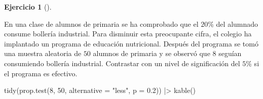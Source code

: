 \documentclass[
  a4paper,
]{scrreport}
\newenvironment{Shaded}{\begin{snugshade}}{\end{snugshade}}
\newcommand{\AttributeTok}[1]{\textcolor[rgb]{0.40,0.45,0.13}{#1}}
\newcommand{\DecValTok}[1]{\textcolor[rgb]{0.68,0.00,0.00}{#1}}
\newcommand{\FloatTok}[1]{\textcolor[rgb]{0.68,0.00,0.00}{#1}}
\newcommand{\FunctionTok}[1]{\textcolor[rgb]{0.28,0.35,0.67}{#1}}
\newcommand{\NormalTok}[1]{\textcolor[rgb]{0.00,0.23,0.31}{#1}}
\newcommand{\SpecialCharTok}[1]{\textcolor[rgb]{0.37,0.37,0.37}{#1}}
\newcommand{\StringTok}[1]{\textcolor[rgb]{0.13,0.47,0.30}{#1}}
\theoremstyle{definition}
\newtheorem{exercise}{Ejercicio}[chapter]
\theoremstyle{remark}
\begin{document}
\begin{exercise}[]\protect\hypertarget{exr-contraste-proporcion-bolleria-industrial}{}\label{exr-contraste-proporcion-bolleria-industrial}

En una clase de alumnos de primaria se ha comprobado que el \(20\)\% del
alumnado consume bollería industrial. Para disminuir esta preocupante
cifra, el colegio ha implantado un programa de educación nutricional.
Después del programa se tomó una muestra aleatoria de \(50\) alumnos de
primaria y se observó que 8 seguían consumiendo bollería industrial.
Contrastar con un nivel de significación del \(5\)\% si el programa es
efectivo.

\end{exercise}

\begin{tcolorbox}[enhanced jigsaw, breakable, opacityback=0, colbacktitle=quarto-callout-tip-color!10!white, colframe=quarto-callout-tip-color-frame, left=2mm, titlerule=0mm, coltitle=black, colback=white, bottomtitle=1mm, toptitle=1mm, opacitybacktitle=0.6, title=\textcolor{quarto-callout-tip-color}{\faLightbulb}\hspace{0.5em}{Solución}, leftrule=.75mm, bottomrule=.15mm, toprule=.15mm, rightrule=.15mm, arc=.35mm]

\begin{Shaded}
\begin{Highlighting}[]
\FunctionTok{tidy}\NormalTok{(}\FunctionTok{prop.test}\NormalTok{(}\DecValTok{8}\NormalTok{, }\DecValTok{50}\NormalTok{, }\AttributeTok{alternative =} \StringTok{"less"}\NormalTok{, }\AttributeTok{p =} \FloatTok{0.2}\NormalTok{)) }\SpecialCharTok{|\textgreater{}} 
    \FunctionTok{kable}\NormalTok{()}
\end{Highlighting}
\end{Shaded}


\end{tcolorbox}
\end{document}
